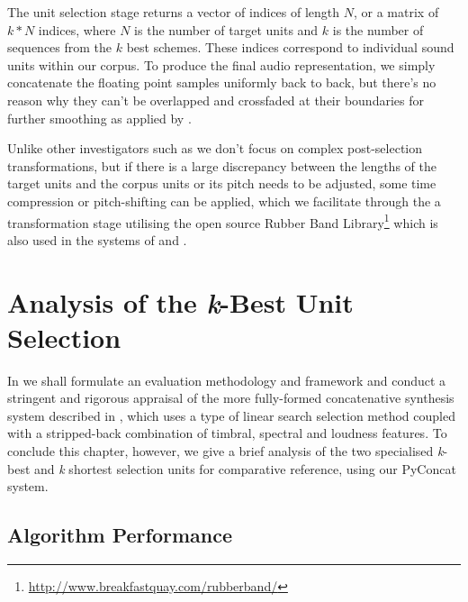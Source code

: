 {{{{{{{{The unit selection stage returns a vector of indices of length $N$, or a matrix of $k*N$ indices, where $N$ is the number of target units and $k$ is the number of sequences from the $k$ best schemes. These indices correspond to individual sound units within our corpus. To produce the final audio representation, we simply concatenate the floating point samples uniformly back to back, but there’s no reason why they can’t be overlapped and crossfaded at their boundaries for further smoothing as applied by \cite{Schwarz2006b}. 

Unlike other investigators such as \cite{Coleman2010} we don't focus on complex post-selection transformations, but if there is a large discrepancy between the lengths of the target units and the corpus units or its pitch needs to be adjusted, some time compression or pitch-shifting can be applied, which we facilitate through the a transformation stage utilising the open source Rubber Band Library\footnote{\url{http://www.breakfastquay.com/rubberband/}} which is also used in the systems of \cite{Davies2013} and \cite{Smith2015}.

\section{Analysis of the \textit{k}-Best Unit Selection}

In  we shall formulate an evaluation methodology and framework and conduct a stringent and rigorous appraisal of the more fully-formed concatenative synthesis system described in , which uses a type of linear search selection method coupled with a stripped-back combination of timbral, spectral and loudness features. To conclude this chapter, however, we give a brief analysis of the two specialised \textit{k}-best and \textit{k} shortest selection units for comparative reference, using our PyConcat system.

\subsection{Algorithm Performance}

}}}}}}}}
